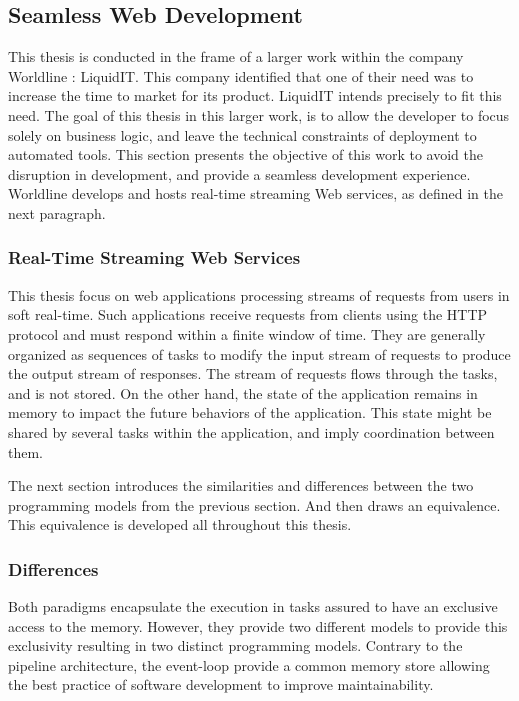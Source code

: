 \subsection{Seamless Web Development}

This thesis is conducted in the frame of a larger work within the company Worldline : LiquidIT.
This company identified that one of their need was to increase the time to market for its product.
LiquidIT intends precisely to fit this need.
The goal of this thesis in this larger work, is to allow the developer to focus solely on business logic, and leave the technical constraints of deployment to automated tools.
This section presents the objective of this work to avoid the disruption in development, and provide a seamless development experience.
Worldline develops and hosts real-time streaming Web services, as defined in the next paragraph.

\subsubsection{Real-Time Streaming Web Services}

This thesis focus on web applications processing streams of requests from users in soft real-time.
Such applications receive requests from clients using the HTTP protocol and must respond within a finite window of time.
They are generally organized as sequences of tasks to modify the input stream of requests to produce the output stream of responses.
The stream of requests flows through the tasks, and is not stored.
On the other hand, the state of the application remains in memory to impact the future behaviors of the application.
This state might be shared by several tasks within the application, and imply coordination between them.

The next section introduces the similarities and differences between the two programming models from the previous section.
And then draws an equivalence.
This equivalence is developed all throughout this thesis.

\subsubsection{Differences}

Both paradigms encapsulate the execution in tasks assured to have an exclusive access to the memory.
However, they provide two different models to provide this exclusivity resulting in two distinct programming models.
Contrary to the pipeline architecture, the event-loop provide a common memory store allowing the best practice of software development to improve maintainability.

